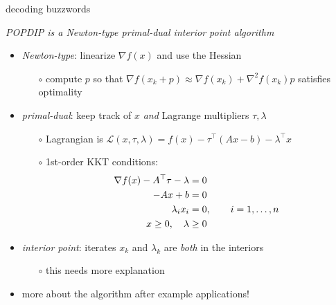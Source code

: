 \documentclass[10pt,hyperref,dvipsnames]{beamer}
\newcommand{\grad}{\nabla}
\newcommand{\ds}{\displaystyle}
\begin{document}
\begin{frame}{decoding buzzwords}

\begin{center}
\emph{POPDIP is a {\color{BrickRed} Newton-type} {\color{OliveGreen} primal-dual} {\color{blue} interior point} algorithm}
\end{center}

\begin{itemize}
\item \emph{{\color{BrickRed} Newton-type}}: linearize $\grad f(x)$ and use the Hessian
    \begin{itemize}
    \item[$\circ$] compute $p$ so that $\grad f(x_k + p) \approx \grad f(x_k) + \grad^2 f(x_k) p$ satisfies optimality
    \end{itemize}
\item \emph{{\color{OliveGreen} primal-dual}}: keep track of $x$ \emph{and} Lagrange multipliers $\tau,\lambda$
    \begin{itemize}
    \item[$\circ$] Lagrangian is \qquad $\ds \mathcal{L}(x,\tau,\lambda) = f(x) - \tau^\top (Ax - b) - \lambda^\top x$
    \item[$\circ$] 1st-order KKT conditions:
\begin{align*}
\grad f(x) - A^\top \tau - \lambda &= 0 \\
-A x + b &= 0 \notag \\
\lambda_i x_i &=0, \qquad i=1,\dots,n \notag \\
x \ge 0, \quad \lambda &\ge 0 \notag
\end{align*}
    \end{itemize}
\item \emph{{\color{blue} interior point}}: iterates $x_k$ and $\lambda_k$ are \emph{both} in the interiors
    \begin{itemize}
    \item[$\circ$] this needs more explanation
    \end{itemize}

\medskip
\item more about the algorithm after example applications!
\end{itemize}
\end{frame}
\end{document}
